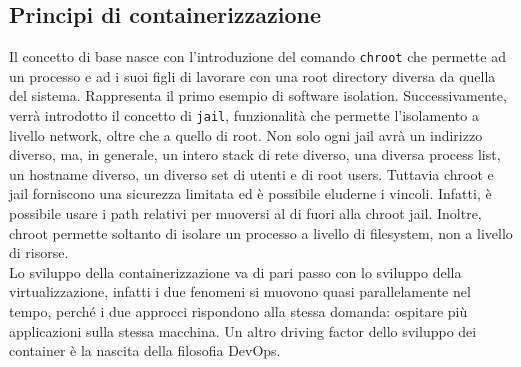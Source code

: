 \documentclass{article}
\begin{document}
		\subsection{Principi di containerizzazione}
		Il concetto di base nasce con l'introduzione del comando \verb|chroot| che permette ad un processo e ad i suoi figli di lavorare con una root directory diversa da quella del sistema. Rappresenta il primo esempio di software isolation. Successivamente, verrà introdotto il concetto di \verb*|jail|, funzionalità che permette l'isolamento a livello network, oltre che a quello di root. Non solo ogni jail avrà un indirizzo diverso, ma, in generale, un intero stack di rete diverso, una diversa process list, un hostname diverso, un diverso set di utenti e di root users.
		Tuttavia chroot e jail forniscono una sicurezza limitata ed è possibile eluderne i vincoli. Infatti, è possibile usare i path
		relativi per muoversi al di fuori alla chroot jail. Inoltre, chroot permette soltanto di isolare un processo a livello di filesystem, non a livello di risorse.\\
		
		Lo sviluppo della containerizzazione va di pari passo con lo sviluppo della virtualizzazione, infatti i due fenomeni si muovono quasi parallelamente nel tempo, perché i due approcci rispondono alla stessa domanda: ospitare più applicazioni sulla stessa macchina. Un altro driving factor dello sviluppo dei container è la nascita della filosofia DevOps.
		
\end{document}
